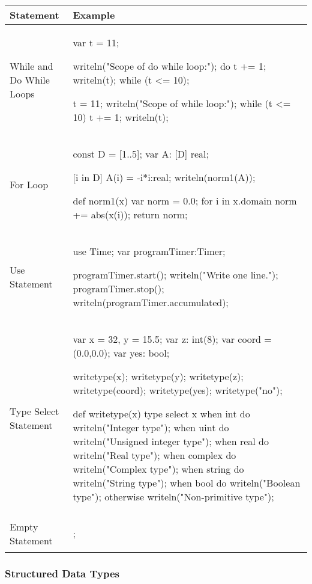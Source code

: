 \begin{center}
\begin{tabular}{|l|l|}
\hline
{\bf Statement} & {\bf Example} \\
\hline
While and Do While Loops &
\begin{chapel} %
var t = 11;

writeln("Scope of do while loop:");
do {
  t += 1;
  writeln(t);
} while (t <= 10);

t = 11;
writeln("Scope of while loop:");
while (t <= 10) {
  t += 1;
  writeln(t);
}
\end{chapel} \\
\hline
For Loop &
\begin{chapel} %
const D = [1..5];
var A: [D] real;

[i in D] A(i) = -i*i:real;
writeln(norm1(A));

def norm1(x) {
  var norm = 0.0;
  for i in x.domain {
    norm += abs(x(i));
  }
  return norm;
}
\end{chapel} \\
\hline
Use Statement &
\begin{chapel} %
use Time;
var programTimer:Timer;

programTimer.start();
writeln("Write one line.");
programTimer.stop();
writeln(programTimer.accumulated);
\end{chapel} \\
\hline
Type Select Statement &
\begin{chapel} %
var x = 32, y = 15.5;
var z: int(8);
var coord = (0.0,0.0);
var yes: bool;

writetype(x);
writetype(y);
writetype(z);
writetype(coord);
writetype(yes);
writetype("no");

def writetype(x) {
  type select x {
    when int do writeln("Integer type");
    when uint do writeln("Unsigned integer type");
    when real do writeln("Real type");
    when complex do writeln("Complex type");
    when string do writeln("String type");
    when bool do writeln("Boolean type");
    otherwise writeln("Non-primitive type");
  }
}
\end{chapel} \\
\hline
Empty Statement &
\begin{chapel}
;
\end{chapel} \\
\hline
\end{tabular}
\end{center}

\subsubsection{Structured Data Types}
\label{Structured_Data_Types}

